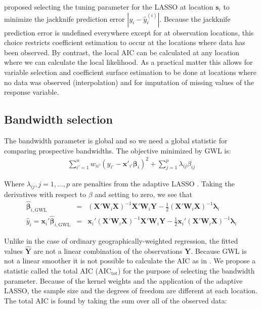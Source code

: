 \documentclass[authoryear, review, 11pt]{elsarticle}
\begin{document}
	\cite{Wheeler:2009} proposed selecting the tuning parameter for the LASSO at location $\bm{s}_i$ to minimize the jackknife prediction error $|y_i - \hat{y}_i^{(i)}|$. Because the jackknife prediction error is undefined everywhere except for at observation locations, this choice restricts coefficient estimation to occur at the locations where data has been observed. By contrast, the local AIC can be calculated at any location where we can calculate the local likelihood. As a practical matter this allows for variable selection and coefficient surface estimation to be done at locations where no data was observed (interpolation) and for imputation of missing values of the response variable.
	 
	\subsection{Bandwidth selection}
	The bandwidth parameter is global and so we need a global statistic for comparing prospective bandwidths. The objective minimized by GWL is:	
	\begin{eqnarray}
		\sum_{i'=1}^n w_{ii'} \left(y_{i'} - \bm{x}'_{i'} \bm{\beta}_i \right)^2 + \sum_{j=1}^p \lambda_{ij} \beta_{ij}
	\end{eqnarray}
	
	Where $\lambda_{ij}, j =1, \dots, p$ are penalties from the adaptive LASSO \citep{Zou:2006}. Taking the derivatives with respect to $\beta$ and setting to zero, we see that
	\begin{eqnarray}
		\hat{\bm{\beta}}_{i, \text{GWL}} &=& \left( \bm{X}'\bm{W}_i\bm{X} \right)^{-1}  \bm{X}'\bm{W}_i\bm{Y}  - \frac{1}{2} \left(\bm{X}'\bm{W}_i\bm{X} \right)^{-1} \bm{\lambda}_i\\
		\hat{y}_i = \bm{x}_i' \hat{\bm{\beta}}_{i, \text{GWL}} &=&  \bm{x}_i' \left( \bm{X}'\bm{W}_i\bm{X} \right)^{-1}  \bm{X}'\bm{W}_i\bm{Y}  - \frac{1}{2} \bm{x}_i' \left(\bm{X}'\bm{W}_i\bm{X} \right)^{-1} \bm{\lambda}_i
	\end{eqnarray}
	
	Unlike in the case of ordinary geographically-weighted regression, the fitted values $\hat{\bm{Y}}$ are not a linear combination of the observations $\bm{Y}$. Because GWL is not a linear smoother it is not possible to calculate the AIC as in \cite{Fotheringham:2002} \citep{Zou:2006}. We propose a statistic called the total AIC ($\mbox{AIC}_{\text{tot}}$) for the purpose of selecting the bandwidth parameter. Because of the kernel weights and the application of the adaptive LASSO, the sample size and the degrees of freedom are different at each location. The total AIC is found by taking the sum over all of the observed data:	
		
\end{document}
